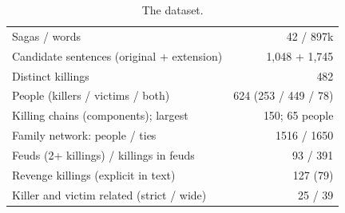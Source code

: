 \begin{table}[tbhp]
\centering
\caption{The dataset.}
\label{tab:overview}
\begin{tabular}{lr}
\toprule
Sagas / words & 42 / 897k \\
Candidate sentences (original + extension) & 1,048 + 1,745 \\
Distinct killings & 482 \\
People (killers / victims / both) & 624 (253 / 449 / 78) \\
Killing chains (components); largest & 150; 65 people \\
Family network: people / ties & 1516 / 1650 \\
Feuds (2+ killings) / killings in feuds & 93 / 391 \\
Revenge killings (explicit in text) & 127 (79) \\
Killer and victim related (strict / wide) & 25 / 39 \\
\bottomrule
\end{tabular}
\end{table}
